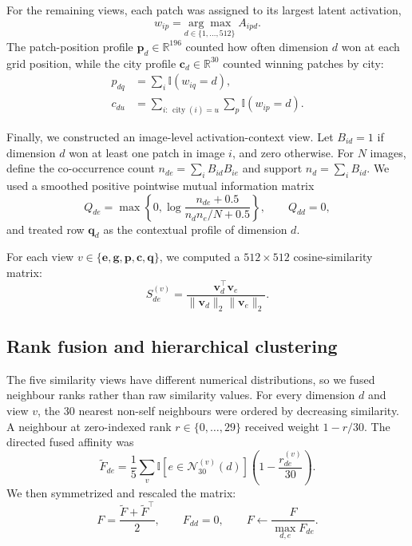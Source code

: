 For the remaining views, each patch was assigned to its largest latent
activation,
\begin{equation}
  w_{ip}=\underset{d\in\{1,\ldots,512\}}{\arg\max}\; A_{ipd}.
  \label{eq:winning_dimension}
\end{equation}
The patch-position profile
$\mathbf{p}_d\in\mathbb{R}^{196}$ counted how often dimension $d$ won at each
grid position, while the city profile
$\mathbf{c}_d\in\mathbb{R}^{30}$ counted winning patches by city:
\begin{align}
  p_{dq} &= \sum_i \mathbb{I}(w_{iq}=d), \\
  c_{du} &= \sum_{i:\,\operatorname{city}(i)=u}\sum_p
            \mathbb{I}(w_{ip}=d).
  \label{eq:position_city_profiles}
\end{align}

Finally, we constructed an image-level activation-context view. Let
$B_{id}=1$ if dimension $d$ won at least one patch in image $i$, and zero
otherwise. For $N$ images, define the co-occurrence count
$n_{de}=\sum_iB_{id}B_{ie}$ and support $n_d=\sum_iB_{id}$. We used a smoothed
positive pointwise mutual information matrix
\begin{equation}
  Q_{de}=\max\left\{
    0,
    \log\frac{n_{de}+0.5}{n_dn_e/N+0.5}
  \right\}, \qquad Q_{dd}=0,
  \label{eq:ppmi}
\end{equation}
and treated row $\mathbf{q}_d$ as the contextual profile of dimension $d$.

For each view $v\in\{\mathbf{e},\mathbf{g},\mathbf{p},\mathbf{c},\mathbf{q}\}$,
we computed a $512\times512$ cosine-similarity matrix:
\begin{equation}
  S^{(v)}_{de}
  =\frac{\mathbf{v}_d^{\top}\mathbf{v}_e}
  {\lVert\mathbf{v}_d\rVert_2\lVert\mathbf{v}_e\rVert_2}.
  \label{eq:view_cosine}
\end{equation}

\subsection{Rank fusion and hierarchical clustering}
\label{sec:hierarchical_clustering}

The five similarity views have different numerical distributions, so we fused
neighbour ranks rather than raw similarity values. For every dimension $d$ and
view $v$, the 30 nearest non-self neighbours were ordered by decreasing
similarity. A neighbour at zero-indexed rank $r\in\{0,\ldots,29\}$ received
weight $1-r/30$. The directed fused affinity was
\begin{equation}
  \widetilde{F}_{de}
  =\frac{1}{5}\sum_v
  \mathbb{I}\!\left[e\in\mathcal{N}^{(v)}_{30}(d)\right]
  \left(1-\frac{r^{(v)}_{de}}{30}\right).
  \label{eq:rank_fusion}
\end{equation}
We then symmetrized and rescaled the matrix:
\begin{equation}
  F=\frac{\widetilde{F}+\widetilde{F}^{\top}}{2},
  \qquad F_{dd}=0, \qquad
  F\leftarrow\frac{F}{\max_{d,e}F_{de}}.
  \label{eq:fused_affinity}
\end{equation}

